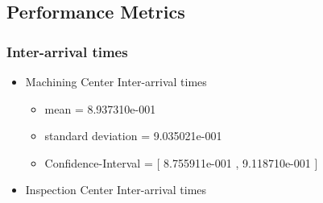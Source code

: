 \documentclass[aps,letterpaper,10pt]{revtex4}
\begin{document}
    \subsection{Performance Metrics}
        \subsubsection{Inter-arrival times}
            \begin{itemize}
                \item Machining Center Inter-arrival times
                    \begin{itemize}
                        \item mean = 8.937310e-001
                        \item standard deviation = 9.035021e-001
                        \item Confidence-Interval = [ 8.755911e-001 , 9.118710e-001 ]
                    \end{itemize}
                    \begin{figure}[htp]
                        \begin{center}
                        \end{center}
                    \end{figure}
                \item Inspection Center Inter-arrival times

\end{itemize}
\end{document}

